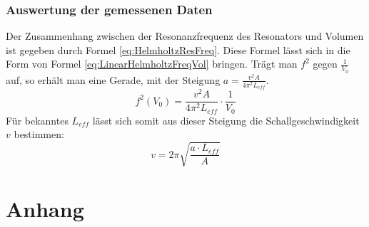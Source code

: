 \documentclass{report}
\begin{document}
\subsection{Auswertung der gemessenen Daten}
Der Zusammenhang zwischen der Resonanzfrequenz des Resonators und Volumen ist gegeben durch Formel \ref{eq:HelmholtzResFreq}.
Diese Formel lässt sich in die Form von Formel \ref{eq:LinearHelmholtzFreqVol} bringen. Trägt man $f^2$ gegen $\frac{1}{V_0}$ auf, so erhält man eine Gerade, mit der Steigung
$a = \frac{v^2 A}{4\pi^2 L_{eff}}$.
\begin{equation}
    f^2(V_0) = \frac{v^2 A}{4\pi^2 L_{eff}} \cdot \frac{1}{V_0}
    \label{eq:LinearHelmholtzFreqVol}
\end{equation}
Für bekanntes $L_{eff}$ lässt sich somit aus dieser Steigung die Schallgeschwindigkeit $v$ bestimmen:
\begin{equation}
    v = 2 \pi \sqrt{\frac{a \cdot L_{eff}}{A}}
\end{equation}



\chapter{Anhang}


\end{document}
